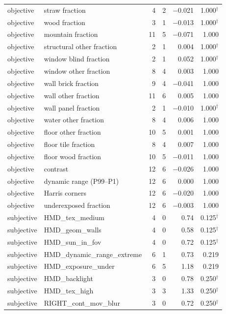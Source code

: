\documentclass[11pt,a4paper]{article}
\begin{document}
\begin{longtable}{llrrrr}
objective & straw fraction & 4 & 2 & $-$0.021 & 1.000$^{\dagger}$ \\
objective & wood fraction & 3 & 1 & $-$0.013 & 1.000$^{\dagger}$ \\
objective & mountain fraction & 11 & 5 & $-$0.071 & 1.000 \\
objective & structural other fraction & 2 & 1 & 0.004 & 1.000$^{\dagger}$ \\
objective & window blind fraction & 2 & 1 & 0.052 & 1.000$^{\dagger}$ \\
objective & window other fraction & 8 & 4 & 0.003 & 1.000 \\
objective & wall brick fraction & 9 & 4 & $-$0.041 & 1.000 \\
objective & wall other fraction & 11 & 6 & 0.005 & 1.000 \\
objective & wall panel fraction & 2 & 1 & $-$0.010 & 1.000$^{\dagger}$ \\
objective & water other fraction & 8 & 4 & 0.006 & 1.000 \\
objective & floor other fraction & 10 & 5 & 0.001 & 1.000 \\
objective & floor tile fraction & 8 & 4 & 0.007 & 1.000 \\
objective & floor wood fraction & 10 & 5 & $-$0.011 & 1.000 \\
objective & contrast & 12 & 6 & $-$0.026 & 1.000 \\
objective & dynamic range (P99--P1) & 12 & 6 & 0.000 & 1.000 \\
objective & Harris corners & 12 & 6 & $-$0.020 & 1.000 \\
objective & underexposed fraction & 12 & 6 & $-$0.003 & 1.000 \\
subjective & HMD\_tex\_medium & 4 & 0 & 0.74 & 0.125$^{\dagger}$ \\
subjective & HMD\_geom\_walls & 4 & 0 & 0.58 & 0.125$^{\dagger}$ \\
subjective & HMD\_sun\_in\_fov & 4 & 0 & 0.72 & 0.125$^{\dagger}$ \\
subjective & HMD\_dynamic\_range\_extreme & 6 & 1 & 0.73 & 0.219 \\
subjective & HMD\_exposure\_under & 6 & 5 & 1.18 & 0.219 \\
subjective & HMD\_backlight & 3 & 0 & 0.78 & 0.250$^{\dagger}$ \\
subjective & HMD\_tex\_high & 3 & 3 & 1.33 & 0.250$^{\dagger}$ \\
subjective & RIGHT\_cont\_mov\_blur & 3 & 0 & 0.72 & 0.250$^{\dagger}$ \\

\end{longtable}
\end{document}
